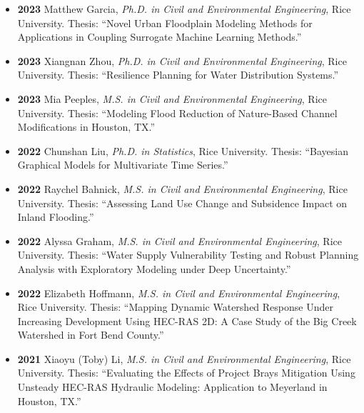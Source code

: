 \documentclass[10pt,oneside]{article}
\begin{document}
\begin{itemize}[label={}]
    \item \textbf{2023} \quad Matthew Garcia, \textit{Ph.D. in Civil and Environmental Engineering}, Rice University. Thesis: \enquote{Novel Urban Floodplain Modeling Methods for Applications in Coupling Surrogate Machine Learning Methods.}
  
    \item \textbf{2023} \quad Xiangnan Zhou, \textit{Ph.D. in Civil and Environmental Engineering}, Rice University. Thesis: \enquote{Resilience Planning for Water Distribution Systems.}
  
    \item \textbf{2023} \quad Mia Peeples, \textit{M.S. in Civil and Environmental Engineering}, Rice University. Thesis: \enquote{Modeling Flood Reduction of Nature-Based Channel Modifications in Houston, TX.}
  
    \item \textbf{2022} \quad Chunshan Liu, \textit{Ph.D. in Statistics}, Rice University. Thesis: \enquote{Bayesian Graphical Models for Multivariate Time Series.}
  
    \item \textbf{2022} \quad Raychel Bahnick, \textit{M.S. in Civil and Environmental Engineering}, Rice University. Thesis: \enquote{Assessing Land Use Change and Subsidence Impact on Inland Flooding.}
  
    \item \textbf{2022} \quad Alyssa Graham, \textit{M.S. in Civil and Environmental Engineering}, Rice University. Thesis: \enquote{Water Supply Vulnerability Testing and Robust Planning Analysis with Exploratory Modeling under Deep Uncertainty.}
  
    \item \textbf{2022} \quad Elizabeth Hoffmann, \textit{M.S. in Civil and Environmental Engineering}, Rice University. Thesis: \enquote{Mapping Dynamic Watershed Response Under Increasing Development Using HEC-RAS 2D: A Case Study of the Big Creek Watershed in Fort Bend County.}
  
    \item \textbf{2021} \quad Xiaoyu (Toby) Li, \textit{M.S. in Civil and Environmental Engineering}, Rice University. Thesis: \enquote{Evaluating the Effects of Project Brays Mitigation Using Unsteady HEC-RAS Hydraulic Modeling: Application to Meyerland in Houston, TX.}
  
\end{itemize}

\end{document}
